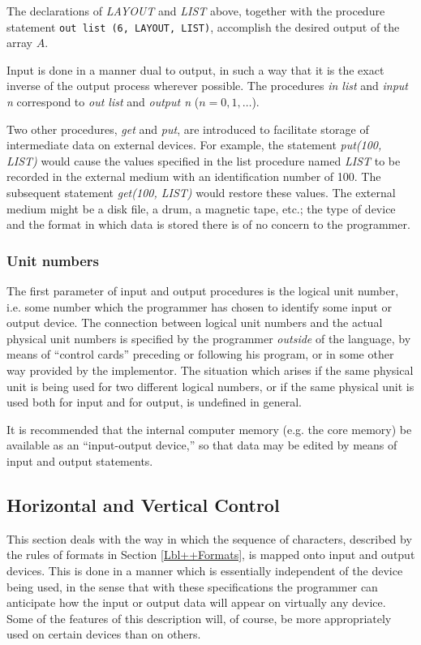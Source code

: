\documentclass[a4paper,11pt]{article}
\begin{document}
The declarations of {\it LAYOUT} and {\it LIST} above, together with
the procedure statement {\tt out list (6, LAYOUT, LIST)}, accomplish
the desired output of the array $A$.

Input is done in a manner dual to output, in such a way that it is the
exact inverse of the output process wherever possible. The procedures
{\it in list} and {\it input n} correspond to {\it out list} and {\it
output n} ($n = 0, 1, \dots$).

Two other procedures, {\it get} and {\it put}, are introduced to
facilitate storage of intermediate data on external devices.  For
example, the statement {\it put(100, LIST)} would cause the values
specified in the list procedure named {\it LIST} to be recorded in the
external medium with an identification number of 100.  The subsequent
statement {\it get(100, LIST)} would restore these values.  The
external medium might be a disk file, a drum, a magnetic tape, etc.;
the type of device and the format in which data is stored there is of
no concern to the programmer.

\subsubsection{Unit numbers}
\label{Lbl++IoProc+General+UnitNumbers}

The first parameter of input and output procedures is the logical unit
number, i.e. some number which the programmer has chosen to identify
some input or output device.  The connection between logical unit
numbers and the actual physical unit numbers is specified by the
programmer {\it outside} of the \Algol language, by means of ``control
cards'' preceding or following his program, or in some other way
provided by the \Algol implementor.  The situation which arises if the
same physical unit is being used for two different logical numbers, or
if the same physical unit is used both for input and for output, is
undefined in general.

It is recommended that the internal computer memory (e.g. the core
memory) be available as an ``input-output device,'' so that data may
be edited by means of input and output statements.


\subsection{Horizontal and Vertical Control}
\label{Lbl++IoProc+HorizVertControl}

This section deals with the way in which the sequence of characters,
described by the rules of formats in Section \ref{Lbl++Formats}, is
mapped onto input and output devices.  This is done in a manner which
is essentially independent of the device being used, in the sense that
with these specifications the programmer can anticipate how the input
or output data will appear on virtually any device.  Some of the
features of this description will, of course, be more appropriately
used on certain devices than on others.
\end{document}
